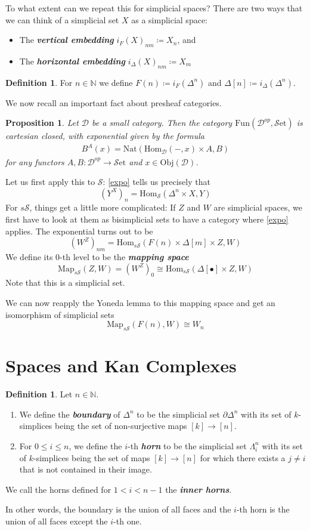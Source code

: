 \documentclass{article}
\newcommand{\textbi}[1]{\textbf{\textit{#1}}}
\newcommand{\D}{\mathscr{D}}
\newcommand{\bN}{\mathbb{N}}
\newcommand{\cS}{\mathcal{S}}
\newcommand{\Obj}{\mathrm{Obj}}
\newcommand{\Hom}{\mathrm{Hom}}
\newcommand{\Set}{\cS\mathrm{et}}
\newcommand{\sS}{s\cS}
\newcommand{\Fun}{\mathrm{Fun}}
\newcommand{\Map}{\mathrm{Map}}
\newcommand{\Nat}{\mathrm{Nat}}
\newtheorem{prop}[subsection]{Proposition}
\theoremstyle{definition}
\newtheorem{defin}[subsection]{Definition}
\begin{document}
To what extent can we repeat this for simplicial spaces? There are two ways that we can think of a simplicial set $X$ as a simplicial space: 
\begin{itemize}
    \item The \textbi{vertical embedding} $i_F(X)_{nm}\coloneqq X_n$, and
    \item The \textbi{horizontal embedding} $i_\Delta(X)_{nm}\coloneqq X_m$
\end{itemize}

\begin{defin}
    For $n\in\bN$ we define $F(n)\coloneqq i_F(\Delta^n)$ and $\Delta[n]\coloneqq  i_\Delta(\Delta^n)$.
\end{defin}

We now recall an important fact about presheaf categories.
\begin{prop}
    Let $\D$ be a small category. Then the category $\Fun(\D^{op}, \Set)$ is cartesian closed, with exponential given by the formula \begin{align}\label{expo}
        B^A(x)=\Nat(\Hom_{\D}(-,x)\times A, B)
    \end{align} for any functors $A,B:\D^{op}\to \Set$ and $x\in\Obj(\D)$.
\end{prop}

Let us first apply this to $\cS$: \ref{expo} tells us precisely that $$(Y^X)_n=\Hom_{\cS}(\Delta^n\times X, Y)$$
For $\sS$, things get a little more complicated: If $Z$ and $W$ are simplicial spaces, we first have to look at them as bisimplicial sets to have a category where \ref{expo} applies. The exponential turns out to be $$(W^Z)_{nm}=\Hom_{\sS}(F(n)\times\Delta[m]\times Z, W)$$
We define its $0$-th level to be the \textbi{mapping space} $$\Map_{\sS}(Z,W)=(W^Z)_0\cong \Hom_{\sS}(\Delta[\bullet]\times Z, W)$$ Note that this is a simplicial set.
\par We can now reapply the Yoneda lemma to this mapping space and get an isomorphism of simplicial sets $$\Map_{\sS}(F(n),W)\cong W_n$$

\section{Spaces and Kan Complexes}

\begin{defin}
    Let $n\in\bN$.
    \begin{enumerate}
        \item We define the \textbi{boundary} of $\Delta^n$ to be the simplicial set $\partial\Delta^n$ with its set of $k$-simplices being the set of non-surjective maps $[k]\to[n]$.
        \item For $0\leq i\leq n$, we define the $i$-th \textbi{horn} to be the simplicial set $\Lambda^n_i$ with its set of $k$-simplices being the set of maps $[k]\to[n]$ for which there exists a $j\ne i$ that is not contained in their image.
    \end{enumerate}
    We call the horns defined for $1<i<n-1$ the \textbi{inner horns}.
\end{defin}
In other words, the boundary is the union of all faces and the $i$-th horn is the union of all faces except the $i$-th one.
\end{document}
